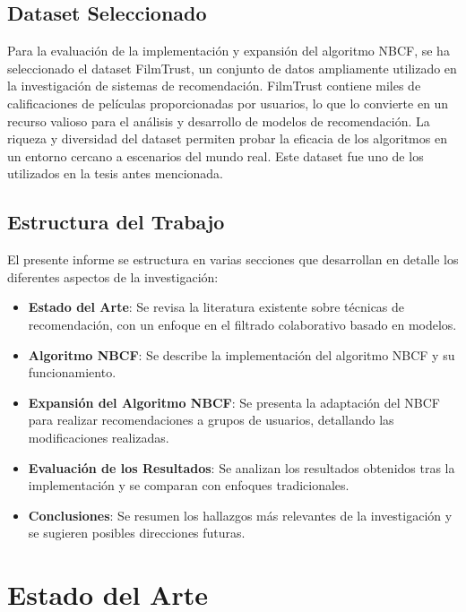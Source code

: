 \documentclass[runningheads,a4paper]{llncs}
\begin{document}
\subsection{Dataset Seleccionado}

Para la evaluación de la implementación y expansión 
del algoritmo NBCF, se ha seleccionado el dataset 
FilmTrust\cite{filmtrust}, un conjunto de datos ampliamente utilizado 
en la investigación de sistemas de recomendación. 
FilmTrust contiene miles de calificaciones de 
películas proporcionadas por usuarios, lo que lo 
convierte en un recurso valioso para el análisis y 
desarrollo de modelos de recomendación. 
La riqueza y diversidad del dataset permiten probar 
la eficacia de los algoritmos en un entorno 
cercano a escenarios del mundo real. 
Este dataset fue uno de los utilizados en la tesis antes mencionada.

\subsection{Estructura del Trabajo}

El presente informe se estructura en varias secciones 
que desarrollan en detalle los diferentes aspectos de 
la investigación:

\begin{itemize} 
    \item \textbf{Estado del Arte}: Se revisa la literatura existente sobre técnicas de recomendación, con un enfoque en el filtrado colaborativo basado en modelos. 
    \item \textbf{Algoritmo NBCF}: Se describe la implementación del algoritmo NBCF y su funcionamiento. 
    \item \textbf{Expansión del Algoritmo NBCF}: Se presenta la adaptación del NBCF para realizar recomendaciones a grupos de usuarios, detallando las modificaciones realizadas. 
    \item \textbf{Evaluación de los Resultados}: Se analizan los resultados obtenidos tras la implementación y se comparan con enfoques tradicionales. 
    \item \textbf{Conclusiones}: Se resumen los hallazgos más relevantes de la investigación y se sugieren posibles direcciones futuras. 
\end{itemize}

\section{Estado del Arte}
\end{document}
